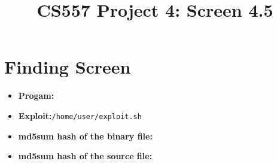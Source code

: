 \documentclass[10pt, conference, letterpaper]{IEEEtran}
\begin{document}
\graphicspath{ {images/} }
\newcommand{\sysname}{ModiPick\xspace}
\newcommand{\Brittany}[1]{{\color{red}\textbf{Brittany: \textit{#1}}}}
\newcommand{\sam}[1]{{\color{blue}\textbf{Sam: \textit{#1}}}}
\newcommand{\eat}[1]{}



\title{CS557 Project 4: Screen 4.5}

\author{
\and
{}
}



\maketitle

\begin{abstract}

\end{abstract}

\section{Finding Screen}

\begin{itemize}
  \item \textbf{Progam:}{\tt }
  \item \textbf{Exploit:}{\tt /home/user/exploit.sh}
  \item \textbf{md5sum hash of the binary file:}
  \item \textbf{md5sum hash of the source file:}
\end{itemize}











%
%
\end{document}

